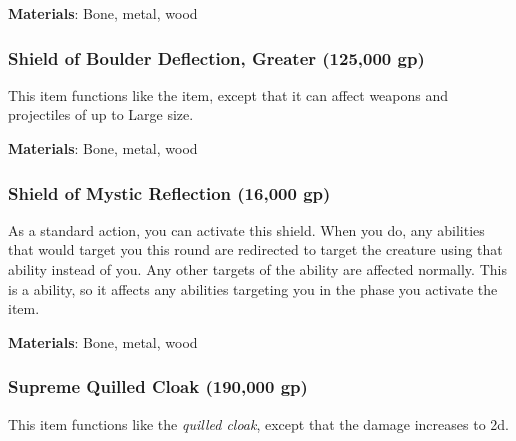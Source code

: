 \vspace{0.25em}
\textbf{Materials}: Bone, metal, wood


\lowercase{\hypertarget{item:Shield of Boulder Deflection, Greater}{}}\label{item:Shield of Boulder Deflection, Greater}
\hypertarget{item:Shield of Boulder Deflection, Greater}{\subsubsection{Shield of Boulder Deflection, Greater\hfill{} (125,000 gp)}}

This item functions like the  item, except that it can affect weapons and projectiles of up to Large size.



\vspace{0.25em}
\textbf{Materials}: Bone, metal, wood


\lowercase{\hypertarget{item:Shield of Mystic Reflection}{}}\label{item:Shield of Mystic Reflection}
\hypertarget{item:Shield of Mystic Reflection}{\subsubsection{Shield of Mystic Reflection\hfill{} (16,000 gp)}}

As a standard action, you can activate this shield.
When you do, any   abilities that would target you this round are redirected to target the creature using that ability instead of you.
Any other targets of the ability are affected normally.
This is a  ability, so it affects any abilities targeting you in the phase you activate the item.



\vspace{0.25em}
\textbf{Materials}: Bone, metal, wood


\lowercase{\hypertarget{item:Supreme Quilled Cloak}{}}\label{item:Supreme Quilled Cloak}
\hypertarget{item:Supreme Quilled Cloak}{\subsubsection{Supreme Quilled Cloak\hfill{} (190,000 gp)}}

This item functions like the \textit{quilled cloak}, except that the damage increases to  \plus2d.



